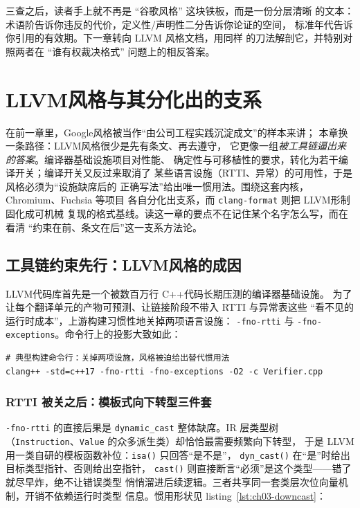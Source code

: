 \documentclass[12pt,a4paper,fontset=fandol]{ctexbook}
\newcommand{\Fn}[1]{\texttt{#1()}}
\newcommand{\Tp}[1]{\texttt{#1}}
\newcommand{\Bk}{\discretionary{}{}{}}
\newcommand{\Lang}[1]{\textsf{#1}}
\newcommand{\CPP}{\Lang{C++}}
\newcommand{\DomGo}{\Lang{Google}}
\newcommand{\DomLlvm}{\Lang{LLVM}}
\begin{document}
三查之后，读者手上就不再是 ``谷歌风格'' 这块铁板，而是一份分层清晰
的文本：术语阶告诉你违反的代价，定义性/声明性二分告诉你论证的空间，
标准年代告诉你引用的有效期。下一章转向 \DomLlvm{} 风格文档，用同样
的刀法解剖它，并特别对照两者在 ``谁有权裁决格式'' 问题上的相反答案。


\chapter{\DomLlvm 风格与其分化出的支系}
\label{ch:ch03-llvm}

在前一章里，\DomGo 风格被当作``由公司工程实践沉淀成文''的样本来讲；
本章换一条路径：\DomLlvm 风格很少是先有条文、再去遵守，
它更像一组\emph{被工具链逼出来的答案}。编译器基础设施项目对性能、
确定性与可移植性的要求，转化为若干编译开关；编译开关又反过来取消了
某些语言设施（RTTI、异常）的可用性，于是风格必须为``设施缺席后的
正确写法''给出唯一惯用法。围绕这套内核，Chromium、Fuchsia 等项目
各自分化出支系，而 \Tp{clang-format} 则把 \DomLlvm 形制固化成可机械
复现的格式基线。读这一章的要点不在记住某个名字怎么写，而在看清
``约束在前、条文在后''这一支系方法论。

\section{工具链约束先行：\DomLlvm 风格的成因}
\label{sec:ch03-cause}

\DomLlvm 代码库首先是一个被数百万行 \CPP 代码长期压测的编译器基础设施。
为了让每个翻译单元的产物可预测、让链接阶段不带入 RTTI 与异常表这些
``看不见的运行时成本''，上游构建习惯性地关掉两项语言设施：
\Tp{-fno-rtti} 与 \Tp{-fno-exceptions}。命令行上的投影大致如此：

\begin{lstlisting}[style=shellstyle,caption={塑造 \DomLlvm 风格的两个编译开关},label={lst:ch03-flags}]
# 典型构建命令行：关掉两项设施，风格被迫给出替代惯用法
clang++ -std=c++17 -fno-rtti -fno-exceptions -O2 -c Verifier.cpp
\end{lstlisting}

\subsection*{RTTI 被关之后：模板式向下转型三件套}

\Tp{-fno-rtti} 的直接后果是 \Tp{dynamic\_{\Bk}cast} 整体缺席。IR 层类型树
（\Tp{Instruction}、\Tp{Value} 的众多派生类）却恰恰最需要频繁向下转型，
于是 \DomLlvm 用一类自研的模板函数补位：\Fn{isa} 只回答``是不是''，
\Fn{dyn\_{\Bk}cast} 在``是''时给出目标类型指针、否则给出空指针，
\Fn{cast} 则直接断言``必须''是这个类型——错了就尽早炸，绝不让错误类型
悄悄溜进后续逻辑。三者共享同一套类层次位向量机制，开销不依赖运行时类型
信息。惯用形状见 listing~\ref{lst:ch03-downcast}：
\end{document}
